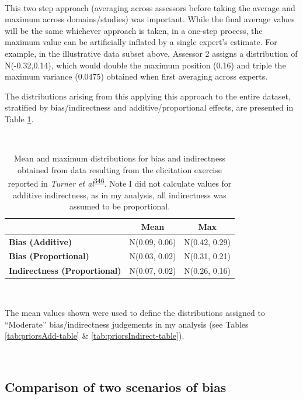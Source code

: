 \documentclass[a4paper, twoside]{templates/ociamthesis}
\begin{document}
~

This two step approach (averaging across assessors before taking the average and maximum across domains/studies) was important. While the final average values will be the same whichever approach is taken, in a one-step process, the maximum value can be artificially inflated by a single expert's estimate. For example, in the illustrative data subset above, Assessor 2 assigns a distribution of N(-0.32,0.14), which would double the maximum position (0.16) and triple the maximum variance (0.0475) obtained when first averaging across experts.

The distributions arising from this applying this approach to the entire dataset, stratified by bias/indirectness and additive/proportional effects, are presented in Table \ref{tab:turnerEstimates-table}.

~\\




\begin{table}[H]

\caption[turnerEstimates]{\label{tab:turnerEstimates-table}Mean and maximum distributions for bias and indirectness obtained from data resulting from the elicitation exercise reported in \emph{Turner et al}\textsuperscript{\protect\hyperlink{ref-turner2009}{346}}. Note I did not calculate values for additive indirectness, as in my analysis, all indirectness was assumed to be proportional.}
\centering
\begin{tabular}[t]{>{}lcc}
\toprule
\textbf{ } & \textbf{Mean} & \textbf{Max}\\
\midrule
\textbf{Bias (Additive)} & N(0.09, 0.06) & N(0.42, 0.29)\\
\textbf{Bias (Proportional)} & N(0.03, 0.02) & N(0.31, 0.21)\\
\textbf{Indirectness (Proportional)} & N(0.07, 0.02) & N(0.26, 0.16)\\
\bottomrule
\end{tabular}
\end{table}

~

The mean values shown were used to define the distributions assigned to ``Moderate'' bias/indirectness judgements in my analysis (see Tables \ref{tab:priorsAdd-table} \& \ref{tab:priorsIndirect-table}).

~

\hypertarget{comparison-of-two-scenarios-of-bias}{%
\subsection{Comparison of two scenarios of bias}\label{comparison-of-two-scenarios-of-bias}}
\end{document}
